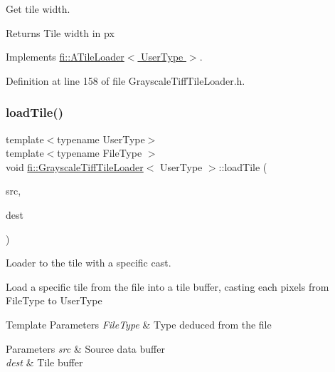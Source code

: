 Get tile width. 

\begin{DoxyReturn}{Returns}
Tile width in px 
\end{DoxyReturn}


Implements \hyperlink{classfi_1_1ATileLoader_ad4ced663628b4134fd8f7bb0cfd2a652}{fi\+::\+A\+Tile\+Loader$<$ User\+Type $>$}.



Definition at line 158 of file Grayscale\+Tiff\+Tile\+Loader.\+h.

\mbox{\label{classfi_1_1GrayscaleTiffTileLoader_aeaea60046a454f93741526f9c2aa51f7}} 
\subsubsection{\texorpdfstring{load\+Tile()}{loadTile()}}
{\footnotesize\ttfamily template$<$typename User\+Type$>$ \\
template$<$typename File\+Type $>$ \\
void \hyperlink{classfi_1_1GrayscaleTiffTileLoader}{fi\+::\+Grayscale\+Tiff\+Tile\+Loader}$<$ User\+Type $>$\+::load\+Tile (\begin{DoxyParamCaption}\item[{tdata\+\_\+t}]{src,  }\item[{User\+Type $\ast$}]{dest }\end{DoxyParamCaption})\hspace{0.3cm}{\ttfamily [inline]}}



Loader to the tile with a specific cast. 

Load a specific tile from the file into a tile buffer, casting each pixels from File\+Type to User\+Type 
\begin{DoxyTemplParams}{Template Parameters}
{\em File\+Type} & Type deduced from the file \\
\hline
\end{DoxyTemplParams}

\begin{DoxyParams}{Parameters}
{\em src} & Source data buffer \\
\hline
{\em dest} & Tile buffer \\
\hline
\end{DoxyParams}



